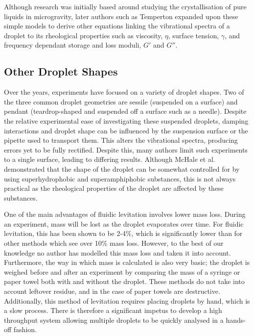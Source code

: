 \documentclass{physics_article_B}
\begin{document}
Although research was initially based around studying the crystallisation of pure liquids in microgravity\cite{wilkes}, later authors such as Temperton expanded upon these simple models to derive other equations linking the vibrational spectra of a droplet to its rheological properties such as viscosity, $\eta$, surface tension, $\gamma$, and frequency dependant storage and loss moduli, $G'$ and $G''$. 

\subsection{Other Droplet Shapes}

Over the years, experiments have focused on a variety of droplet shapes. Two of the three common droplet geometries are sessile (suspended on a surface)\cite{Temperton2012, vukasinovic, Backholm2017} and pendant (teardrop-shaped and suspended off a surface such as a needle)\cite{Temperton2012}. Despite the relative experimental ease of investigating these suspended droplets, damping interactions and droplet shape can be influenced by the suspension surface or the pipette used to transport them\cite{Sharp2011}. This alters the vibrational spectra, producing errors yet to be fully rectified\cite{harrold}. Despite this, many authors limit such experiments to a single surface\cite{Sharp2011}, leading to differing results. Although McHale et al. demonstrated that the shape of the droplet can be somewhat controlled for by using superhydrophobic and superamphiphobic substances, this is not always practical as the rheological properties of the droplet are affected by these substances.

One of the main advantages of fluidic levitation involves lower mass loss. During an experiment, mass will be lost as the droplet evaporates over time. For fluidic levitation, this has been shown to be 2-4\%, which is significantly lower than for other methods which see over 10\% \cite{harrold2} mass loss. However, to the best of our knowledge no author has modelled this mass loss and taken it into account. Furthermore, the way in which mass is calculated is also very basic; the droplet is weighed before and after an experiment by comparing the mass of a syringe or paper towel both with and without the droplet. These methods do not take into account leftover residue, and in the case of paper towels are destructive. Additionally, this method of levitation requires placing droplets by hand, which is a slow process. There is therefore a significant impetus to develop a high throughput system allowing multiple droplets to be quickly analysed in a hands-off fashion.
\end{document}
